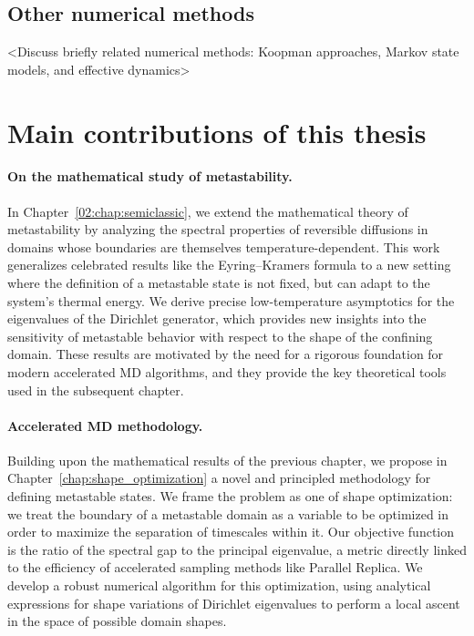 \subsection{Other numerical methods}
<Discuss briefly related numerical methods: Koopman approaches, Markov state models, and effective dynamics>

\section{Main contributions of this thesis}
\label{sec:01:contributions}
\paragraph{On the mathematical study of metastability.}
In Chapter~\ref{02:chap:semiclassic}, we extend the mathematical theory of metastability by analyzing the spectral properties of reversible diffusions in domains whose boundaries are themselves temperature-dependent. %
This work generalizes celebrated results like the Eyring--Kramers formula to a new setting where the definition of a metastable state is not fixed, but can adapt to the system's thermal energy. %
We derive precise low-temperature asymptotics for the eigenvalues of the Dirichlet generator, which provides new insights into the sensitivity of metastable behavior with respect to the shape of the confining domain. %
These results are motivated by the need for a rigorous foundation for modern accelerated MD algorithms, and they provide the key theoretical tools used in the subsequent chapter. %

\paragraph{Accelerated MD methodology.}
Building upon the mathematical results of the previous chapter, we propose in Chapter~\ref{chap:shape_optimization} a novel and principled methodology for defining metastable states. %
We frame the problem as one of shape optimization: we treat the boundary of a metastable domain as a variable to be optimized in order to maximize the separation of timescales within it. %
Our objective function is the ratio of the spectral gap to the principal eigenvalue, a metric directly linked to the efficiency of accelerated sampling methods like Parallel Replica. %
We develop a robust numerical algorithm for this optimization, using analytical expressions for shape variations of Dirichlet eigenvalues to perform a local ascent in the space of possible domain shapes. %

